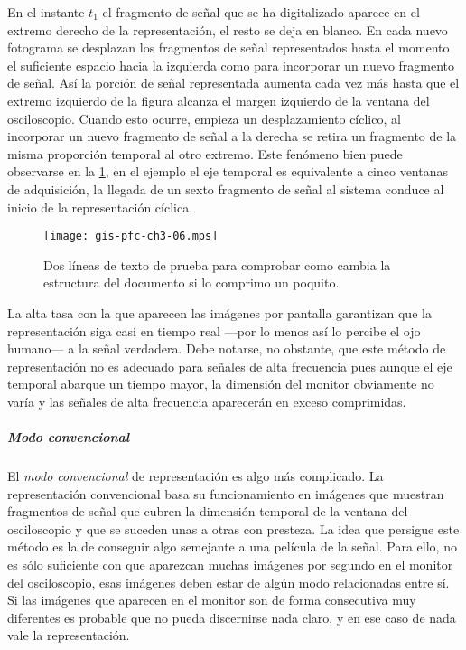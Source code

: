 En el instante $t_1$ el fragmento de señal que se ha digitalizado aparece
en el extremo derecho de la representación, el resto se deja en blanco. En
cada nuevo fotograma se desplazan los fragmentos de señal representados
hasta el momento el suficiente espacio hacia la izquierda como para
incorporar un nuevo fragmento de señal. Así la porción de señal
representada aumenta cada vez más hasta que el extremo izquierdo de la
figura alcanza el margen izquierdo de la ventana del osciloscopio. Cuando
esto ocurre, empieza un desplazamiento cíclico, al incorporar un nuevo
fragmento de señal a la derecha se retira un fragmento de la misma
proporción temporal al otro extremo. Este fenómeno bien puede observarse en
la \cref{fig:modcontii}, en el ejemplo el eje temporal es equivalente a
cinco ventanas de adquisición, la llegada de un sexto fragmento de señal al
sistema conduce al inicio de la representación cíclica.

\begin{figure}
	\begin{center}
		\texttt{[image: gis-pfc-ch3-06.mps]}
	\end{center}
	\caption[Dos líneas de prueba]{Dos líneas de texto de prueba para
	comprobar como cambia la estructura del documento si lo comprimo un
	poquito.}
	\label{fig:modcontii}
\end{figure}

La alta tasa con la que aparecen las imágenes por pantalla garantizan que
la representación siga casi en tiempo real ---por lo menos así lo percibe
el ojo humano--- a la señal verdadera. Debe notarse, no obstante, que este
método de representación no es adecuado para señales de alta frecuencia
pues aunque el eje temporal abarque un tiempo mayor, la dimensión del
monitor obviamente no varía y las señales de alta frecuencia aparecerán en
exceso comprimidas.


\subparagraph{Modo convencional}

El \emph{modo convencional} de representación es algo más complicado. La
representación convencional basa su funcionamiento en imágenes que muestran
fragmentos de señal que cubren la dimensión temporal de la ventana del
osciloscopio y que se suceden unas a otras con presteza. La idea que
persigue este método es la de conseguir algo semejante a una película de la
señal. Para ello, no es sólo suficiente con que aparezcan muchas imágenes
por segundo en el monitor del osciloscopio, esas imágenes deben estar de
algún modo relacionadas entre sí. Si las imágenes que aparecen en el
monitor son de forma consecutiva muy diferentes es probable que no pueda
discernirse nada claro, y en ese caso de nada vale la representación.

